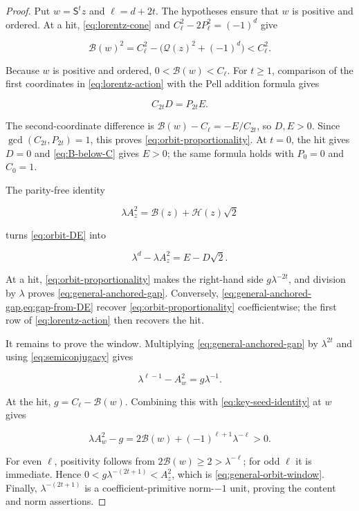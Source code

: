 \begin{proof}
Put $w=\mathsf S^tz$ and $\ell=d+2t$. The hypotheses ensure that $w$ is
positive and ordered. At a hit, \cref{eq:lorentz-cone} and
$C_\ell^2-2P_\ell^2=(-1)^d$ give

\begin{equation}
 \mathcal B(w)^2
 =C_\ell^2-\bigl(\mathcal Q(z)^2+(-1)^d\bigr)<C_\ell^2.
 \label{eq:B-below-C}
\end{equation}

Because $w$ is positive and ordered, $0<\mathcal B(w)<C_\ell$. For
$t\geqslant1$, comparison of the first coordinates in
\cref{eq:lorentz-action} with the Pell addition formula gives

\begin{equation}
 C_{2t}D=P_{2t}E.
\end{equation}

The second-coordinate difference is
$\mathcal B(w)-C_\ell=-E/C_{2t}$, so $D,E>0$. Since
$\gcd(C_{2t},P_{2t})=1$, this proves
\cref{eq:orbit-proportionality}. At $t=0$, the hit gives $D=0$ and
\cref{eq:B-below-C} gives $E>0$; the same formula holds with
$P_0=0$ and $C_0=1$.

The parity-free identity

\begin{equation}
 \lambda A_z^2=\mathcal B(z)+\mathcal H(z)\sqrt2
 \label{eq:key-seed-identity}
\end{equation}

turns \cref{eq:orbit-DE} into

\begin{equation}
 \lambda^d-\lambda A_z^2=E-D\sqrt2.
 \label{eq:gap-from-DE}
\end{equation}

At a hit, \cref{eq:orbit-proportionality} makes the right-hand side
$g\lambda^{-2t}$, and division by $\lambda$ proves
\cref{eq:general-anchored-gap}. Conversely,
\cref{eq:general-anchored-gap,eq:gap-from-DE} recover
\cref{eq:orbit-proportionality} coefficientwise; the first row of
\cref{eq:lorentz-action} then recovers the hit.

It remains to prove the window. Multiplying
\cref{eq:general-anchored-gap} by $\lambda^{2t}$ and using
\cref{eq:semiconjugacy} gives

\begin{equation}
 \lambda^{\ell-1}-A_w^2=g\lambda^{-1}.
 \label{eq:evolved-gap}
\end{equation}

At the hit, $g=C_\ell-\mathcal B(w)$. Combining this with
\cref{eq:key-seed-identity} at $w$ gives

\begin{equation}
 \lambda A_w^2-g
 =2\mathcal B(w)+(-1)^{\ell+1}\lambda^{-\ell}>0.
\end{equation}

For even $\ell$, positivity follows from
$2\mathcal B(w)\geqslant2>\lambda^{-\ell}$; for odd $\ell$ it is immediate.
Hence $0<g\lambda^{-(2t+1)}<A_z^2$, which is
\cref{eq:general-orbit-window}. Finally,
$\lambda^{-(2t+1)}$ is a coefficient-primitive norm-$-1$ unit, proving the
content and norm assertions.
\end{proof}

